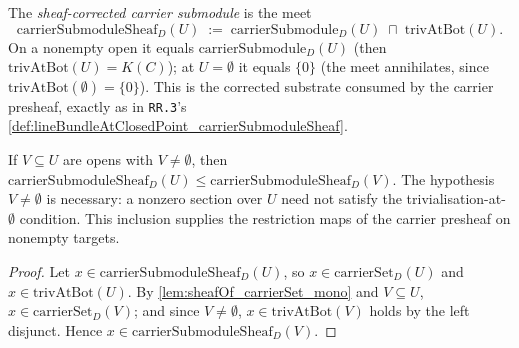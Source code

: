 \begin{definition}

\leanok
[Sheaf-corrected carrier submodule enforcing \(F(\bot) = 0\)]
  \label{def:sheafOf_carrierSubmoduleSheaf}
  The \emph{sheaf-corrected carrier submodule} is the meet
  \[
    \mathrm{carrierSubmoduleSheaf}_D(U) \;:=\;
    \mathrm{carrierSubmodule}_D(U) \;\sqcap\; \mathrm{trivAtBot}(U).
  \]
  On a nonempty open it equals \(\mathrm{carrierSubmodule}_D(U)\) (then
  \(\mathrm{trivAtBot}(U) = K(C)\)); at \(U = \emptyset\) it equals \(\{0\}\)
  (the meet annihilates, since \(\mathrm{trivAtBot}(\emptyset) = \{0\}\)).
  This is the corrected substrate consumed by the carrier presheaf, exactly
  as in \texttt{RR.3}'s
  \cref{def:lineBundleAtClosedPoint_carrierSubmoduleSheaf}.
\end{definition}

\begin{lemma}

  \label{lem:sheafOf_carrierSubmoduleSheaf_le}
  If \(V \subseteq U\) are opens with \(V \ne \emptyset\), then
  \(\mathrm{carrierSubmoduleSheaf}_D(U) \le
  \mathrm{carrierSubmoduleSheaf}_D(V)\). The hypothesis \(V \ne \emptyset\)
  is necessary: a nonzero section over \(U\) need not satisfy the
  trivialisation-at-\(\emptyset\) condition. This inclusion supplies the
  restriction maps of the carrier presheaf on nonempty targets.
\end{lemma}

\begin{proof}
  \leanok
  Let \(x \in \mathrm{carrierSubmoduleSheaf}_D(U)\), so
  \(x \in \mathrm{carrierSet}_D(U)\) and \(x \in \mathrm{trivAtBot}(U)\). By
  \cref{lem:sheafOf_carrierSet_mono} and \(V \subseteq U\),
  \(x \in \mathrm{carrierSet}_D(V)\); and since \(V \ne \emptyset\),
  \(x \in \mathrm{trivAtBot}(V)\) holds by the left disjunct. Hence
  \(x \in \mathrm{carrierSubmoduleSheaf}_D(V)\).
\end{proof}

